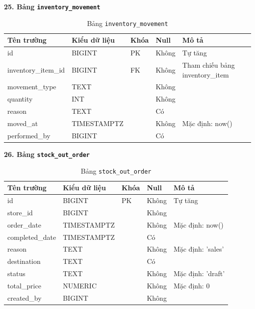 \documentclass[12pt,a4paper]{report}
\begin{document}
\vspace{0.3cm}
\textbf{25. Bảng \texttt{inventory\_movement}}
\vspace{0.1cm}
\begin{longtable}{|>{\ttfamily}p{3.5cm}|p{2.5cm}|p{1.5cm}|p{1.5cm}|p{5cm}|}
\caption{Bảng \texttt{inventory\_movement}} \label{tab:db_inventory_movement} \\
\hline
\normalfont\textbf{Tên trường} & \textbf{Kiểu dữ liệu} & \textbf{Khóa} & \textbf{Null} & \textbf{Mô tả} \\ \hline
id & BIGINT & PK & Không & Tự tăng \\ \hline
inventory\_item\_id & BIGINT & FK & Không & Tham chiếu bảng inventory\_item \\ \hline
movement\_type & TEXT & & Không & \\ \hline
quantity & INT & & Không & \\ \hline
reason & TEXT & & Có & \\ \hline
moved\_at & TIMESTAMPTZ & & Không & Mặc định: now() \\ \hline
performed\_by & BIGINT & & Có & \\ \hline
\end{longtable}

\vspace{0.3cm}
\textbf{26. Bảng \texttt{stock\_out\_order}}
\vspace{0.1cm}
\begin{longtable}{|>{\ttfamily}p{3.5cm}|p{2.5cm}|p{1.5cm}|p{1.5cm}|p{5cm}|}
\caption{Bảng \texttt{stock\_out\_order}} \label{tab:db_stock_out_order} \\
\hline
\normalfont\textbf{Tên trường} & \textbf{Kiểu dữ liệu} & \textbf{Khóa} & \textbf{Null} & \textbf{Mô tả} \\ \hline
id & BIGINT & PK & Không & Tự tăng \\ \hline
store\_id & BIGINT & & Không & \\ \hline
order\_date & TIMESTAMPTZ & & Không & Mặc định: now() \\ \hline
completed\_date & TIMESTAMPTZ & & Có & \\ \hline
reason & TEXT & & Không & Mặc định: 'sales' \\ \hline
destination & TEXT & & Có & \\ \hline
status & TEXT & & Không & Mặc định: 'draft' \\ \hline
total\_price & NUMERIC & & Không & Mặc định: 0 \\ \hline
created\_by & BIGINT & & Không & \\ \hline
\end{longtable}
\end{document}
